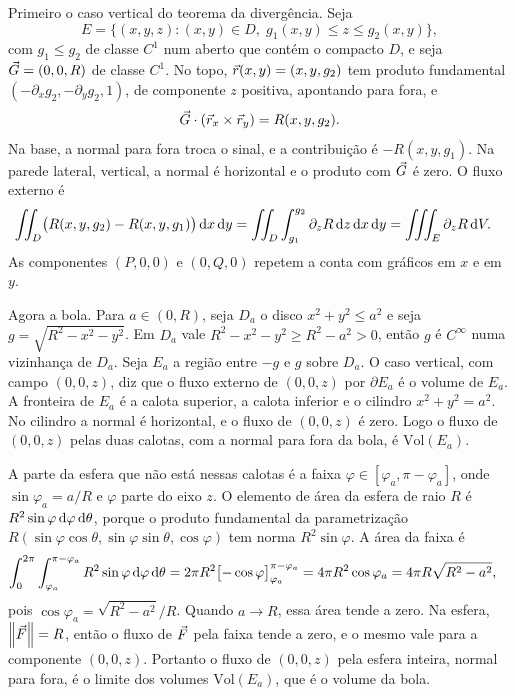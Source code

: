 \documentclass[11pt,a4paper]{article}
\begin{document}
Primeiro o caso vertical do teorema da divergência. Seja
\[
E=\bigl\{(x,y,z):(x,y)\in D,\; g_1(x,y)\le z\le g_2(x,y)\bigr\},
\]
com $g_1\le g_2$ de classe $C^1$ num aberto que contém o compacto $D$, e seja $\vec{G}=(0,0,R)$ de classe $C^1$. No topo, $\vec{r}(x,y)=(x,y,g_2)$ tem produto fundamental $(-\partial_x g_2,-\partial_y g_2,1)$, de componente $z$ positiva, apontando para fora, e
\[
\vec{G}\cdot(\vec{r}_x\times\vec{r}_y)=R(x,y,g_2).
\]
Na base, a normal para fora troca o sinal, e a contribuição é $-R(x,y,g_1)$. Na parede lateral, vertical, a normal é horizontal e o produto com $\vec{G}$ é zero. O fluxo externo é
\begin{align*}
\iint_D\bigl(R(x,y,g_2)-R(x,y,g_1)\bigr)\,\mathrm{d} x\,\mathrm{d} y
&=\iint_D\int_{g_1}^{g_2}\partial_z R\,\mathrm{d} z\,\mathrm{d} x\,\mathrm{d} y
=\iiint_E\partial_z R\,\mathrm{d} V.
\end{align*}
As componentes $(P,0,0)$ e $(0,Q,0)$ repetem a conta com gráficos em $x$ e em $y$.

Agora a bola. Para $a\in(0,R)$, seja $D_a$ o disco $x^2+y^2\le a^2$ e seja $g=\sqrt{R^2-x^2-y^2}$. Em $D_a$ vale $R^2-x^2-y^2\ge R^2-a^2>0$, então $g$ é $C^\infty$ numa vizinhança de $D_a$. Seja $E_a$ a região entre $-g$ e $g$ sobre $D_a$. O caso vertical, com campo $(0,0,z)$, diz que o fluxo externo de $(0,0,z)$ por $\partial E_a$ é o volume de $E_a$. A fronteira de $E_a$ é a calota superior, a calota inferior e o cilindro $x^2+y^2=a^2$. No cilindro a normal é horizontal, e o fluxo de $(0,0,z)$ é zero. Logo o fluxo de $(0,0,z)$ pelas duas calotas, com a normal para fora da bola, é $\mathrm{Vol}(E_a)$.

A parte da esfera que não está nessas calotas é a faixa $\varphi\in[\varphi_a,\pi-\varphi_a]$, onde $\sin\varphi_a=a/R$ e $\varphi$ parte do eixo $z$. O elemento de área da esfera de raio $R$ é $R^2\sin\varphi\,\mathrm{d}\varphi\,\mathrm{d}\theta$, porque o produto fundamental da parametrização $R(\sin\varphi\cos\theta,\sin\varphi\sin\theta,\cos\varphi)$ tem norma $R^2\sin\varphi$. A área da faixa é
\begin{align*}
\int_0^{2\pi}\int_{\varphi_a}^{\pi-\varphi_a} R^2\sin\varphi\,\mathrm{d}\varphi\,\mathrm{d}\theta
&=2\pi R^2\bigl[-\cos\varphi\bigr]_{\varphi_a}^{\pi-\varphi_a}
=4\pi R^2\cos\varphi_a
=4\pi R\sqrt{R^2-a^2},
\end{align*}
pois $\cos\varphi_a=\sqrt{R^2-a^2}/R$. Quando $a\to R$, essa área tende a zero. Na esfera, $\left\lVert \vec{F} \right\rVert=R$, então o fluxo de $\vec{F}$ pela faixa tende a zero, e o mesmo vale para a componente $(0,0,z)$. Portanto o fluxo de $(0,0,z)$ pela esfera inteira, normal para fora, é o limite dos volumes $\mathrm{Vol}(E_a)$, que é o volume da bola.
\end{document}
